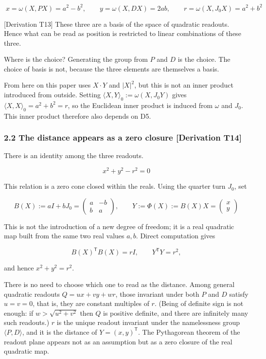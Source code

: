 \documentclass[
  a4paper,
]{article}
\begin{document}
\[
\boxed{\;x=\omega(X,PX)=a^2-b^2,\qquad y=\omega(X,DX)=2ab,\qquad r=\omega(X,J_0X)=a^2+b^2\;}
\]

{[}Derivation T13{]} These three are a basis of the space of quadratic
readouts. Hence what can be read as position is restricted to linear
combinations of these three.

Where is the choice? Generating the group from \(P\) and \(D\) is the
choice. The choice of basis is not, because the three elements are
themselves a basis.

From here on this paper uses \(X\cdot Y\) and \(\lvert X\rvert^2\), but
this is not an inner product introduced from outside. Setting
\(\langle X,Y\rangle_0:=\omega(X,J_0Y)\) gives
\(\langle X,X\rangle_0=a^2+b^2=r\), so the Euclidean inner product is
induced from \(\omega\) and \(J_0\). This inner product therefore also
depends on D5.

\subsubsection{2.2 The distance appears as a zero closure {[}Derivation
T14{]}}\label{the-distance-appears-as-a-zero-closure-derivation-t14}

There is an identity among the three readouts.

\[
\boxed{\;x^2+y^2-r^2=0\;}
\]

This relation is a zero cone closed within the reals. Using the quarter
turn \(J_0\), set

\[
B(X):=aI+bJ_0=
\begin{pmatrix}a&-b\\b&a\end{pmatrix},
\qquad
Y:=\Phi(X):=B(X)X=
\begin{pmatrix}x\\y\end{pmatrix}
\]

This is not the introduction of a new degree of freedom; it is a real
quadratic map built from the same two real values \(a,b\). Direct
computation gives

\[
B(X)^{\mathsf T}B(X)=rI,
\qquad
Y^{\mathsf T}Y=r^2,
\]

and hence \(x^2+y^2=r^2\).

There is no need to choose which one to read as the distance. Among
general quadratic readouts \(Q=ux+vy+wr\), those invariant under both
\(P\) and \(D\) satisfy \(u=v=0\), that is, they are constant multiples
of \(r\). (Being of definite sign is not enough: if \(w>\sqrt{u^2+v^2}\)
then \(Q\) is positive definite, and there are infinitely many such
readouts.) \(r\) is the unique readout invariant under the namelessness
group \(\langle P,D\rangle\), and it is the distance of
\(Y=(x,y)^{\mathsf T}\). The Pythagorean theorem of the readout plane
appears not as an assumption but as a zero closure of the real quadratic
map.
\end{document}
